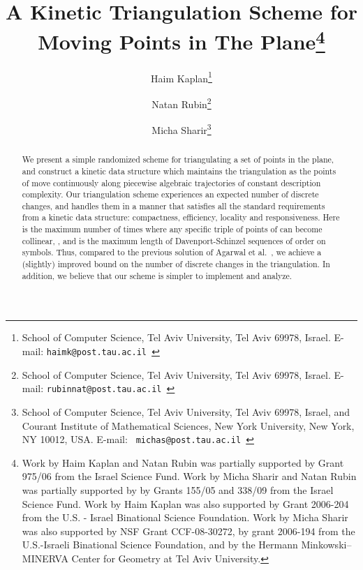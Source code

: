 \documentclass[11pt]{article}
\begin{document}
\begin{titlepage}
\title{A Kinetic Triangulation Scheme for Moving Points in The Plane\thanks{Work by Haim Kaplan and Natan Rubin was partially supported by Grant 975/06 from the
Israel Science Fund. Work by Micha Sharir and Natan Rubin was partially supported by
by Grants 155/05 and 338/09 from the Israel Science Fund. Work by Haim Kaplan was also supported by Grant 2006-204 from the U.S. - Israel Binational Science Foundation. Work by Micha Sharir was also supported by
NSF Grant CCF-08-30272, by grant 2006-194 from the U.S.-Israeli 
Binational Science Foundation, 
and by the Hermann Minkowski--MINERVA
Center for Geometry at Tel Aviv University.}}

\author{
Haim Kaplan\thanks{School of Computer Science, Tel Aviv University, Tel Aviv 69978,
Israel. 
E-mail: {\tt haimk@post.tau.ac.il }} \and
Natan Rubin\thanks{School of Computer Science, Tel Aviv University, Tel Aviv 69978,
Israel. 
E-mail: {\tt rubinnat@post.tau.ac.il }} \and
Micha Sharir\thanks{School of Computer Science, Tel Aviv University, Tel Aviv 69978,
Israel, and Courant Institute of Mathematical Sciences, New York
University, New York, NY 10012, USA. E-mail: {\tt
michas@post.tau.ac.il }} }
\maketitle

\begin{abstract}
We present a simple randomized scheme for triangulating a set 
of  points in the plane, and construct a kinetic data structure 
which maintains the triangulation as the points of  move
continuously along piecewise algebraic trajectories of constant
description complexity. Our triangulation scheme experiences an expected number of  discrete changes, and handles them in a
manner that satisfies all the standard requirements from a kinetic
data structure: compactness, efficiency, locality and responsiveness. Here  is the maximum number of times where any specific triple of points of  can become collinear, , and  is the maximum length of Davenport-Schinzel sequences of order  on  symbols. 
Thus, compared to the previous solution of Agarwal et al.~\cite{AWY}, we achieve a (slightly) improved bound on the number of discrete changes in the triangulation.
In addition, we believe that our scheme is simpler to implement and analyze.
\end{abstract}
\end{titlepage}
\end{document}
